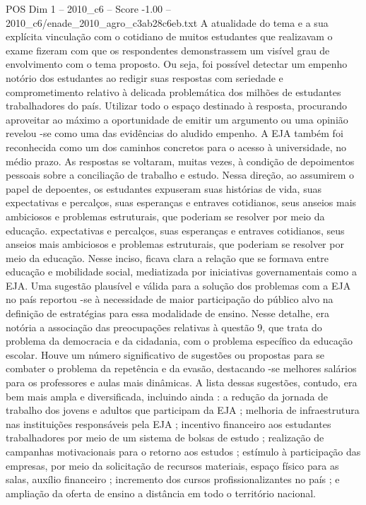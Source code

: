 \begin{textsample}{POS Dim 1 – 2010\_c6 – Score -1.00 – 2010\_c6/enade\_2010\_agro\_c3ab28c6eb.txt}
A atualidade do tema e a sua explícita vinculação com o cotidiano de muitos estudantes que realizavam o exame fizeram com que os respondentes demonstrassem um visível grau de envolvimento com o tema proposto.
Ou seja, foi possível detectar um empenho notório dos estudantes ao redigir suas respostas com seriedade e comprometimento relativo à delicada problemática dos milhões de estudantes trabalhadores do país.
Utilizar todo o espaço destinado à resposta, procurando aproveitar ao máximo a oportunidade de emitir um argumento ou uma opinião revelou -se como uma das evidências do aludido empenho.
A EJA também foi reconhecida como um dos caminhos concretos para o acesso à universidade, no médio prazo.
As respostas se voltaram, muitas vezes, à condição de depoimentos pessoais sobre a conciliação de trabalho e estudo.
Nessa direção, ao assumirem o papel de depoentes, os estudantes expuseram suas histórias de vida, suas expectativas e percalços, suas esperanças e entraves cotidianos, seus anseios mais ambiciosos e problemas estruturais, que poderiam se resolver por meio da educação. expectativas e percalços, suas esperanças e entraves cotidianos, seus anseios mais ambiciosos e problemas estruturais, que poderiam se resolver por meio da educação.
Nesse inciso, ficava clara a relação que se formava entre educação e mobilidade social, mediatizada por iniciativas governamentais como a EJA.
Uma sugestão plausível e válida para a solução dos problemas com a EJA no país reportou -se à necessidade de maior participação do público alvo na definição de estratégias para essa modalidade de ensino.
Nesse detalhe, era notória a associação das preocupações relativas à questão 9, que trata do problema da democracia e da cidadania, com o problema específico da educação escolar.
Houve um número significativo de sugestões ou propostas para se combater o problema da repetência e da evasão, destacando -se melhores salários para os professores e aulas mais dinâmicas.
A lista dessas sugestões, contudo, era bem mais ampla e diversificada, incluindo ainda : a redução da jornada de trabalho dos jovens e adultos que participam da EJA ; melhoria de infraestrutura nas instituições responsáveis pela EJA ; incentivo financeiro aos estudantes trabalhadores por meio de um sistema de bolsas de estudo ; realização de campanhas motivacionais para o retorno aos estudos ; estímulo à participação das empresas, por meio da solicitação de recursos materiais, espaço físico para as salas, auxílio financeiro ; incremento dos cursos profissionalizantes no país ; e ampliação da oferta de ensino a distância em todo o território nacional.

\end{textsample}
